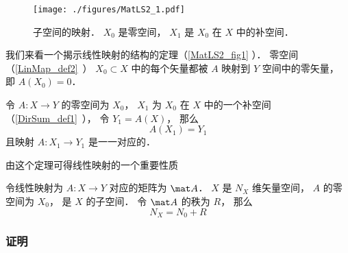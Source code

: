 

\begin{figure}[ht]
\centering
\texttt{[image: ./figures/MatLS2\_1.pdf]}
\caption{子空间的映射． $X_0$ 是零空间， $X_1$ 是 $X_0$ 在 $X$ 中的补空间．} \label{MatLS2_fig1}
\end{figure}
我们来看一个揭示线性映射的结构的定理（\autoref{MatLS2_fig1} ）． 零空间（\autoref{LinMap_def2}~） $X_0 \subset X$ 中的每个矢量都被 $A$ 映射到 $Y$ 空间中的零矢量， 即 $A(X_0) = \qty{0}$．
\begin{theorem}{}
令 $A:X \to Y$ 的零空间为 $X_0$， $X_1$ 为 $X_0$ 在 $X$ 中的一个补空间（\autoref{DirSum_def1}~）， 令 $Y_1 = A(X)$， 那么
\begin{equation}
A(X_1) = Y_1
\end{equation}
且映射 $A:X_1\to Y_1$ 是一一对应的．
\end{theorem}
由这个定理可得线性映射的一个重要性质
\begin{corollary}{}
令线性映射为 $A:X\to Y$ 对应的矩阵为 $\mat A$． $X$ 是 $N_X$ 维矢量空间， $A$ 的零空间为 $X_0$， 是 $X$ 的子空间． 令 $\mat A$ 的秩为 $R$， 那么
\begin{equation}
N_X = N_0 + R
\end{equation}
\end{corollary}


\subsubsection{证明}
